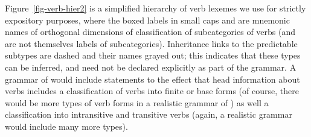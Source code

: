 \documentclass[output=paper
 	        ,biblatex
                ,babelshorthands
                ,newtxmath
                ,draftmode
                ,colorlinks, citecolor=brown
]{langscibook}
\begin{document}
Figure~\ref{fig-verb-hier2} is a simplified  hierarchy of verb lexemes we use for strictly expository purposes, where the boxed labels in small caps  and  are mnemonic names of orthogonal dimensions of classification  of subcategories of verbs (and are not themselves labels of subcategories). Inheritance links to the predictable subtypes are dashed and their names grayed out; this indicates that these types can be inferred, and need not be declared explicitly as part of the grammar. A grammar of  would include statements to the effect that head information about verbs includes a classification of verbs into finite or base forms (of course, there would be more types of verb forms in a realistic grammar of ) as well a classification into intransitive and transitive verbs (again, a realistic grammar would include many more types).
\end{document}

